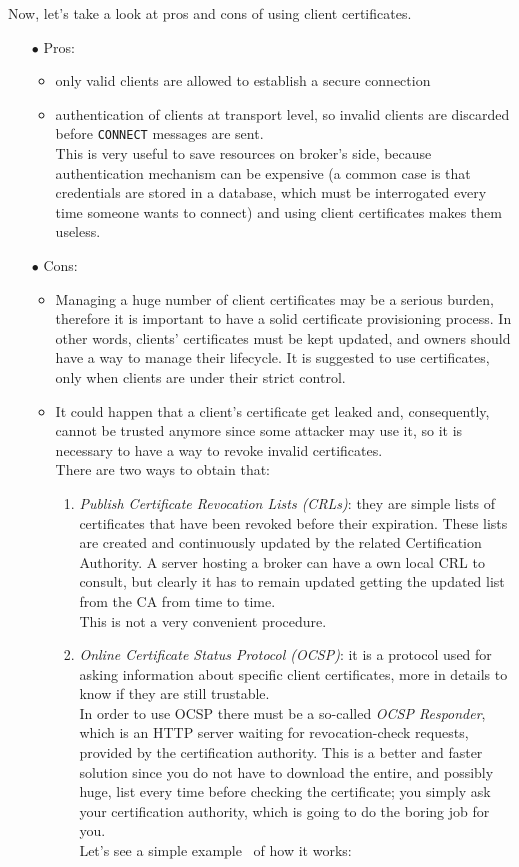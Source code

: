 \documentclass[12pt]{report}
\begin{document}
{{Now, let's take a look at pros and cons of using client certificates.
\begin{itemize}
\setlength{\itemindent}{+4mm}
\item[$\bullet$] Pros:
\begin{itemize}
\item only valid clients are allowed to establish a secure connection
\item authentication of clients at transport level, so invalid clients are discarded before \texttt{CONNECT} messages are sent.\\ 
This is very useful to save resources on broker's side, because authentication mechanism can be expensive (a common case is that credentials are stored in a database, which must be interrogated every time someone wants to connect) and using client certificates makes them useless.
\end{itemize}

\item[$\bullet$] Cons:
\begin{itemize}
\item Managing a huge number of client certificates may be a serious burden, therefore it is important to have a solid certificate provisioning process. In other words, clients' certificates must be kept updated, and owners should have a way to manage their lifecycle.
It is suggested to use certificates, only when clients are under their strict control.
\item It could happen that a client's certificate get leaked and, consequently, cannot be trusted anymore since some attacker may use it, so it is necessary to have a way to revoke invalid certificates.\\
There are two ways to obtain that:

\begin{enumerate}
\item \emph{Publish Certificate Revocation Lists (CRLs)}: they are simple lists of certificates that have been revoked before their expiration.
These lists are created and continuously updated by the related Certification Authority.
A server hosting a broker can have a own local CRL to consult, but clearly it has to remain updated getting the updated list from the CA from time to time.\\
This is not a very convenient procedure.
\item \emph{Online Certificate Status Protocol (OCSP)}:  it is a protocol used for asking information about specific client certificates, more in details to know if they are still trustable.\\
In order to use OCSP there must be a so-called \emph{OCSP Responder}, which is an HTTP server waiting for revocation-check requests, provided by the certification authority.
This is a better and faster solution since you do not have to download the entire, and possibly huge, list every time before checking the certificate; you simply ask your certification authority, which is going to do the boring job for you.\\
Let's see a simple example~\cite{ocspwiki} of how it works:


\end{enumerate}
\end{itemize}
\end{itemize}}}
\end{document}
